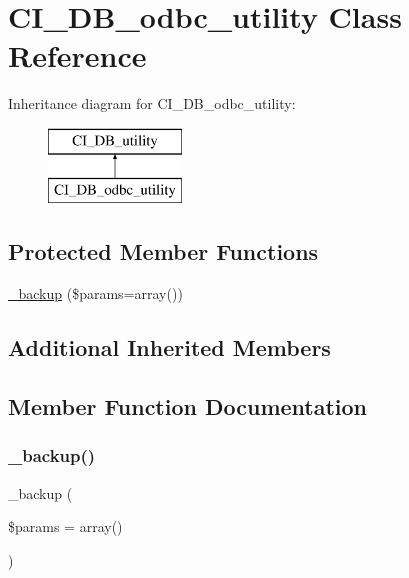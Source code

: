 \hypertarget{class_c_i___d_b__odbc__utility}{}\section{C\+I\+\_\+\+D\+B\+\_\+odbc\+\_\+utility Class Reference}
\label{class_c_i___d_b__odbc__utility}
Inheritance diagram for C\+I\+\_\+\+D\+B\+\_\+odbc\+\_\+utility\+:\begin{figure}[H]
\begin{center}
\leavevmode
\includegraphics[height=2.000000cm]{class_c_i___d_b__odbc__utility}
\end{center}
\end{figure}
\subsection*{Protected Member Functions}
\begin{DoxyCompactItemize}
\item 
\mbox{\hyperlink{class_c_i___d_b__odbc__utility_a30f3053d2c82e7562349924363507afa}{\+\_\+backup}} (\$params=array())
\end{DoxyCompactItemize}
\subsection*{Additional Inherited Members}


\subsection{Member Function Documentation}
\mbox{\label{class_c_i___d_b__odbc__utility_a30f3053d2c82e7562349924363507afa}} 
\subsubsection{\texorpdfstring{\+\_\+backup()}{\_backup()}}
{\footnotesize\ttfamily \+\_\+backup (\begin{DoxyParamCaption}\item[{}]{\$params = {\ttfamily array()} }\end{DoxyParamCaption})\hspace{0.3cm}{\ttfamily [protected]}}

